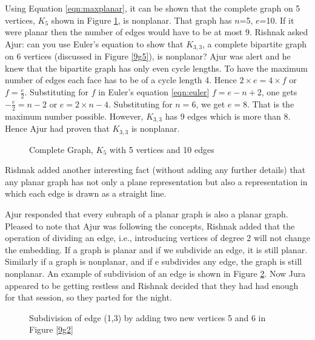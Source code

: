 Using Equation \ref{eqn:maxplanar}, it can be shown that the complete graph on 5 vertices, $K_5$ shown in Figure \ref{9g10}, is nonplanar. That graph has $n$=5, $e$=10. If it were planar then the number of edges would have to be at most $9$. 
Rishnak asked Ajur: can you use Euler's equation to show that $K_{3,3}$, a complete bipartite graph on 6 vertices (discussed in Figure \ref{9g5}), is nonplanar? 
Ajur was alert and he knew that the bipartite graph has only even cycle lengths. To have the maximum number of edges each face has to be of a cycle length 4. Hence $2\times e =4 \times f$ or $f=\frac{e}{2}$. Substituting for $f$ in Euler's equation \ref{eqn:euler}
$f=e-n+2$, one gets $-\frac{e}{2}=n-2$ or $e=2\times n -4$. Substituting for $n=6$, we get $e=8$. That is the maximum number possible. However, $K_{3,3}$ has 9 edges which is more than 8. Hence Ajur had proven that $K_{3,3}$ is nonplanar.
\begin{figure}
\begin{center}
\caption{ Complete Graph, $K_5$ with 5 vertices and 10 edges }\label{9g10}
\end{center}
\end{figure}
Rishnak added another interesting fact (without adding any further details) that any planar graph has not only a plane representation but also a representation in which each edge is drawn as a straight line.

Ajur responded that every subraph of a planar graph is also a planar graph. Pleased to note that Ajur was following the concepts, Rishnak added that the operation of dividing an edge, i.e., introducing vertices of degree 2 will not change the embedding. If a graph is planar and if we subdivide an edge, it is still planar. Similarly if a graph is nonplanar, and if e subdivides any edge, the graph is still nonplanar. An example of subdivision of an edge is shown in Figure \ref{9g9}. Now Jura appeared to be getting restless and Rishnak decided that they had had enough for that session, so they parted for the night.

\begin{figure}[h]
\begin{center}
\caption{ Subdivision of edge (1,3) by adding two new vertices 5 and 6 in Figure \ref{9g2}}\label{9g9}
\end{center}
\end{figure}
